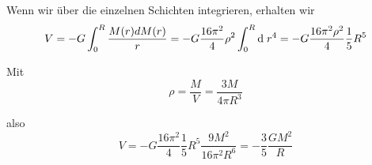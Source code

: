 \documentclass[a4paper,german,12pt,smallheadings]{scrartcl}
\begin{document}
Wenn wir über die einzelnen Schichten integrieren, erhalten wir
\begin{equation}
  V = -G \int_0^R \frac{M(r) dM(r)}{r} = -G \frac{16 \pi^2}{4} \rho^2 \int_0^R \dif \; r^4 = -G\frac{16 \pi^2 \rho^2}{4} \frac{1}{5} R^5
\end{equation}

Mit
\begin{equation}
  \rho = \frac{M}{V} = \frac{3 M}{4 \pi R^3}
\end{equation}

also
\begin{equation}
  V = -G \frac{16 \pi^2}{4} \frac{1}{5} R^5 \frac{9 M^2}{16\pi^2 R^6} = - \frac{3}{5} \frac{G M^2}{R}
\end{equation}

\newpage
\begin{landscape}
  
\end{landscape}
\end{document}
